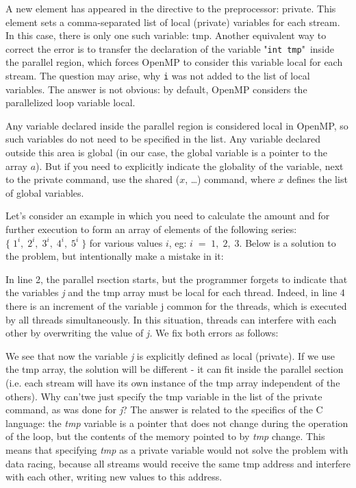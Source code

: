 {	\begin{figure}[H]
		
	\end{figure}
	\par A new element has appeared in the directive to the preprocessor: private. This element sets a comma-separated list of local (private) variables for each stream. In this case, there is only one such variable: tmp. Another equivalent way to correct the error is to transfer the declaration of the variable "\texttt{int tmp}"\ inside the parallel region, which forces OpenMP to consider this variable local for each stream. The question may arise, why \texttt{i} was not added to the list of local variables. The answer is not obvious: by default, OpenMP considers the parallelized loop variable local.
	\par Any variable declared inside the parallel region is considered local in OpenMP, so such variables do not need to be specified in the list. Any variable declared outside this area is global (in our case, the global variable is a pointer to the array $a$). But if you need to explicitly indicate the globality of the variable, next to the private command, use the shared ($x$, \ldots) command, where $x$ defines the list of global variables.
	\par Let's consider an example in which you need to calculate the amount and for further execution to form an array of elements of the following series: $\{\;1^i,\;2^i,\;3^i,\;4^i,\;5^i\;\}$ for various values $i$, eg: $i\;=\;1,\;2,\;3$. Below is a solution to the problem, but intentionally make a mistake in it:
	\begin{figure}[H]
		
	\end{figure}
	\par In line 2, the parallel rsection starts, but the programmer forgets to indicate that the variables\textit{ j} and the tmp array must be local for each thread. Indeed, in line 4 there is an increment of the variable j common for the threads, which is executed by all threads simultaneously. In this situation, threads can interfere with each other by overwriting the value of\textit{ j.} We fix both errors as follows:
	\begin{figure}[H]
		
	\end{figure}
	\par We see that now the variable \textit{j} is explicitly defined as local (private). If we use the tmp array, the solution will be different - it can fit inside the parallel section (i.e. each stream will have its own instance of the tmp array independent of the others). Why can'twe just specify the tmp variable in the list of the private command, as was done for \textit{j}? The answer is related to the specifics of the C language: the \textit{tmp} variable is a pointer that does not change during the operation of the loop, but the contents of the memory pointed to by \textit{tmp }change. This means that specifying \textit{tmp} as a private variable would not solve the problem with data racing, because all streams would receive the same tmp address and interfere with each other, writing new values to this address.
}
